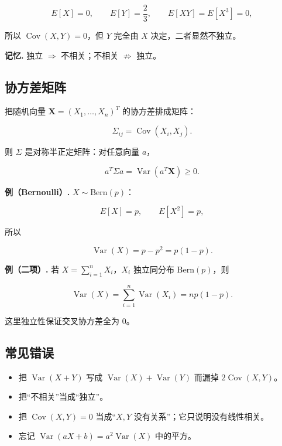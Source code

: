 \[
E[X]=0,\qquad E[Y]=\frac23,\qquad E[XY]=E[X^3]=0,
\]

所以 $\operatorname{Cov}(X,Y)=0$，但 $Y$ 完全由 $X$ 决定，二者显然不独立。

\textbf{记忆.} 独立 $\Rightarrow$ 不相关；不相关 $\nRightarrow$ 独立。

\subsection{协方差矩阵}


把随机向量 $\mathbf X=(X_1,\dots,X_n)^T$ 的协方差排成矩阵：

\[
\Sigma_{ij}=\operatorname{Cov}(X_i,X_j).
\]

则 $\Sigma$ 是对称半正定矩阵：对任意向量 $a$，

\[
a^T\Sigma a=\operatorname{Var}(a^T\mathbf X)\ge0.
\]

\textbf{例（Bernoulli）.} $X\sim\mathrm{Bern}(p)$：

\[
E[X]=p,\qquad E[X^2]=p,
\]

所以

\[
\operatorname{Var}(X)=p-p^2=p(1-p).
\]

\textbf{例（二项）.} 若 $X=\sum_{i=1}^nX_i$，$X_i$ 独立同分布 $\mathrm{Bern}(p)$，则

\[
\operatorname{Var}(X)=\sum_{i=1}^n\operatorname{Var}(X_i)=np(1-p).
\]

这里独立性保证交叉协方差全为 $0$。

\subsection{常见错误}


\begin{itemize}
\item 把 $\operatorname{Var}(X+Y)$ 写成 $\operatorname{Var}(X)+\operatorname{Var}(Y)$ 而漏掉 $2\operatorname{Cov}(X,Y)$。
\item 把“不相关”当成“独立”。
\item 把 $\operatorname{Cov}(X,Y)=0$ 当成“$X,Y$ 没有关系”；它只说明没有线性相关。
\item 忘记 $\operatorname{Var}(aX+b)=a^2\operatorname{Var}(X)$ 中的平方。
\end{itemize}
